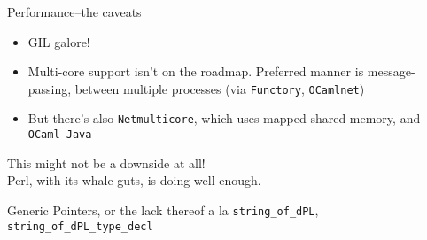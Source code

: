 \documentclass{beamer}
\begin{document}
\begin{frame}{Performance--the caveats}
  \begin{itemize}
  \item GIL galore!
    \pause
  \item Multi-core support isn't on the roadmap. Preferred manner is
    message-passing, between multiple processes (via
    \texttt{Functory}, \texttt{OCamlnet})
    \pause
  \item But there's also \texttt{Netmulticore}, which uses mapped
    shared memory, and \texttt{OCaml-Java}
  \end{itemize}
\end{frame}

\begin{frame}{}
  \begin{block}{}
    This might not be a downside at all!\\
    Perl, with its whale guts, is doing well enough.
  \end{block}
  \begin{block}{Generic Pointers, or the lack thereof}
    a la \texttt{string\_of\_dPL}, \texttt{string\_of\_dPL\_type\_decl}
  \end{block}
\end{frame}
\end{document}

